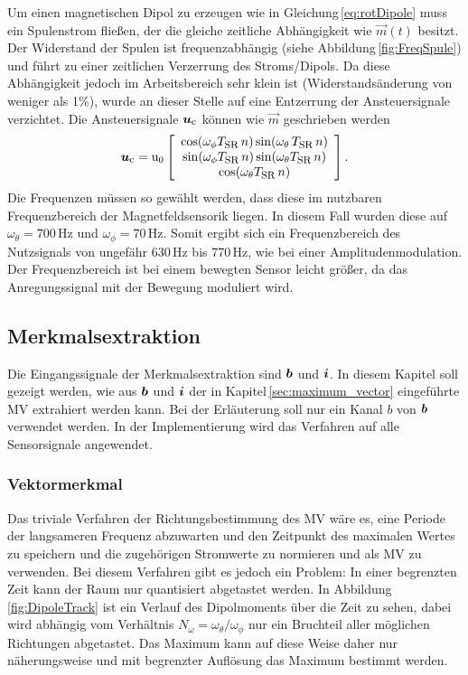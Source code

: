 Um einen magnetischen Dipol zu erzeugen wie in Gleichung\,\ref{eq:rotDipole} muss ein Spulenstrom fließen, der die gleiche zeitliche Abhängigkeit wie $\vec{m}(t)$ besitzt. Der Widerstand der Spulen ist frequenzabhängig (siehe Abbildung\,\ref{fig:FreqSpule}) und führt zu einer zeitlichen Verzerrung des Stroms/Dipols. Da diese Abhängigkeit jedoch im Arbeitsbereich sehr klein ist (Widerstandsänderung von weniger als 1\%), wurde an dieser Stelle auf eine Entzerrung der Ansteuersignale verzichtet. Die Ansteuersignale $\mbox{\boldmath ${u}$}_{\textrm{\footnotesize{c}}}$ können wie $\vec{m}$ geschrieben werden
\begin{equation}
    \mbox{\boldmath ${u}$}_{\textrm{\footnotesize{c}}} = \text{u}_0 \left[\begin{array}{c} \cos(\omega_\phi  T_{\textrm{\footnotesize{SR}}}\,n) \sin(\omega_\theta\, T_{\textrm{\footnotesize{SR}}}  \,n)\\ \sin(\omega_\phi  T_{\textrm{\footnotesize{SR}}}\,n)\sin(\omega_\theta  T_{\textrm{\footnotesize{SR}}}\,n)\\ \cos(\omega_\theta  T_{\textrm{\footnotesize{SR}}}\,n) \end{array}\right].
    \label{eq:rotDipole}
  \end{equation}
Die Frequenzen müssen so gewählt werden, dass diese im nutzbaren Frequenzbereich der Magnetfeldsensorik liegen. In diesem Fall wurden diese auf $\omega_\theta = 700\,\text{Hz}$ und $\omega_\phi = 70\,\text{Hz}$. Somit ergibt sich ein Frequenzbereich des Nutzsignals von ungefähr 630\,Hz bis 770\,Hz, wie bei einer Amplitudenmodulation. Der Frequenzbereich ist bei einem bewegten Sensor leicht größer, da das Anregungssignal mit der Bewegung moduliert wird.


\subsection{Merkmalsextraktion}
\label{sec:featext}
Die Eingangssignale der Merkmalsextraktion sind $\mbox{\boldmath ${b}$}$ und $\mbox{\boldmath ${i}$}$. In diesem Kapitel soll gezeigt werden, wie aus $\mbox{\boldmath ${b}$}$ und $\mbox{\boldmath ${i}$}$ der in Kapitel\,\ref{sec:maximum_vector} eingeführte MV extrahiert werden kann. Bei der Erläuterung soll nur ein Kanal $b$ von $\mbox{\boldmath ${b}$}$ verwendet werden. In der Implementierung wird das Verfahren auf alle Sensorsignale angewendet. 

\subsubsection{Vektormerkmal}
Das triviale Verfahren der Richtungsbestimmung des MV wäre es, eine Periode der langsameren Frequenz abzuwarten und den Zeitpunkt des maximalen Wertes zu speichern und die zugehörigen Stromwerte zu normieren und als MV zu verwenden. Bei diesem Verfahren gibt es jedoch ein Problem: In einer begrenzten Zeit kann der Raum nur quantisiert abgetastet werden. In Abbildung \ref{fig:DipoleTrack} ist ein Verlauf des Dipolmoments über die Zeit zu sehen, dabei wird abhängig vom Verhältnis $N_\omega=\omega_\theta / \omega_\phi$ nur ein Bruchteil aller möglichen Richtungen abgetastet. Das Maximum kann auf diese Weise daher nur näherungsweise und mit begrenzter Auflösung das Maximum bestimmt werden.

